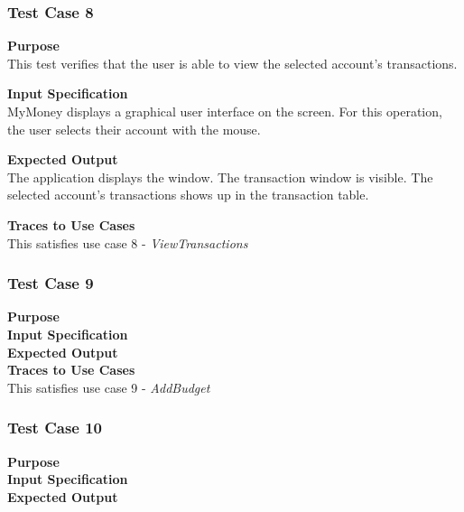 \documentclass[12pt]{article}
\begin{document}
\subsubsection{Test Case 8} \label{TC-8}
\noindent
{\bf Purpose}\\
This test verifies that the user is able to view the selected account's transactions.
                                                        
\noindent
{\bf Input Specification}\\
MyMoney displays a graphical user interface on the screen.
For this operation, the user selects their account with the mouse.

\noindent
{\bf Expected Output}\\
The application displays the window.       
The transaction window is visible.
The selected account's transactions shows up in the transaction table. 

\noindent
{\bf Traces to Use Cases}\\
This satisfies use case 8 - \textit{ViewTransactions}

\clearpage %
\subsubsection{Test Case 9} \label{TC-9}
\noindent
{\bf Purpose}\\
                                                        
\noindent
{\bf Input Specification}\\

\noindent
{\bf Expected Output}\\

\noindent
{\bf Traces to Use Cases}\\
This satisfies use case 9 - \textit{AddBudget}

\subsubsection{Test Case 10} \label{TC-10}
\noindent
{\bf Purpose}\\
                                                        
\noindent
{\bf Input Specification}\\

\noindent
{\bf Expected Output}\\
\end{document}
